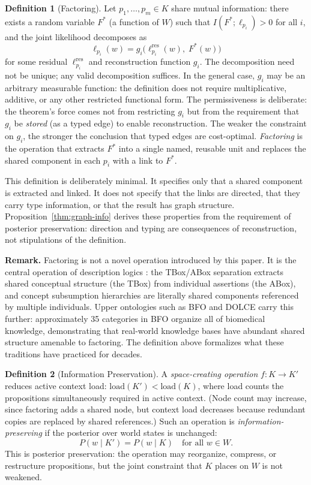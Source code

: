 \documentclass[11pt]{article}
\theoremstyle{definition}
\newtheorem{definition}{Definition}
\begin{document}
\begin{definition}[Factoring]
\label{def:factoring}
Let $p_1, \ldots, p_m \in K$ share mutual information: there exists a
random variable $F^*$ (a function of $W$) such that
$I(F^*; \ell_{p_i}) > 0$ for all $i$, and the joint likelihood
decomposes as
\[
\ell_{p_i}(w) = g_i\!\bigl(\ell_{p_i}^{\text{res}}(w),\; F^*(w)\bigr)
\]
for some residual $\ell_{p_i}^{\text{res}}$ and reconstruction function
$g_i$. The decomposition need not be unique; any valid decomposition
suffices. In the general case, $g_i$ may be an arbitrary measurable
function: the definition does not require multiplicative,
additive, or any other restricted functional form. The permissiveness
is deliberate: the theorem's force comes not from restricting $g_i$
but from the requirement that $g_i$ be \emph{stored} (as a typed edge)
to enable reconstruction. The weaker the constraint on $g_i$, the
stronger the conclusion that typed edges are cost-optimal.
\emph{Factoring} is the operation that extracts $F^*$ into a single
named, reusable unit and replaces the shared component in each $p_i$
with a link to $F^*$.

This definition is deliberately minimal. It specifies only that a
shared component is extracted and linked. It does not specify that
the links are directed, that they carry type information, or that
the result has graph structure. Proposition~\ref{thm:graph-info}
derives these properties from the requirement of posterior
preservation: direction and typing are consequences of
reconstruction, not stipulations of the definition.

\textbf{Remark.} Factoring is not a novel operation introduced by this
paper. It is the central operation of description logics
\cite{BaaderCalvaneseEtAl2003}: the TBox/ABox separation extracts shared
conceptual structure (the TBox) from individual assertions (the ABox),
and concept subsumption hierarchies are literally shared components
referenced by multiple individuals. Upper ontologies such as BFO
\cite{Arp2015} and DOLCE \cite{Masolo2003} carry this further:
approximately 35 categories in BFO organize all of biomedical knowledge,
demonstrating that real-world knowledge bases have abundant shared
structure amenable to factoring. The definition above formalizes what
these traditions have practiced for decades.
\end{definition}

\begin{definition}[Information Preservation]
\label{def:preservation}
A \emph{space-creating operation} $f : K \to K'$ reduces active context
load: $\mathrm{load}(K') < \mathrm{load}(K)$, where load counts the
propositions simultaneously required in active context. (Node count may
increase, since factoring adds a shared node, but context load decreases
because redundant copies are replaced by shared references.) Such an
operation is \emph{information-preserving} if the posterior over world
states is unchanged:
\[
P(w \mid K') = P(w \mid K) \quad \text{for all } w \in W.
\]
This is posterior preservation: the operation may reorganize, compress,
or restructure propositions, but the joint constraint that $K$ places
on $W$ is not weakened.
\end{definition}
\end{document}
